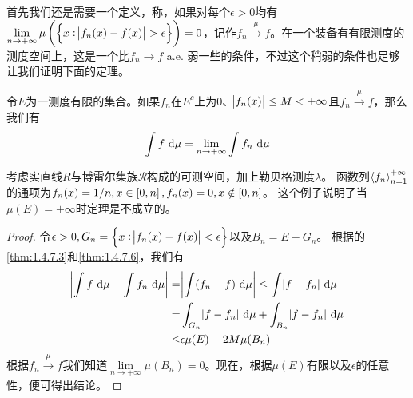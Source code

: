 \documentclass[../main.tex]{subfiles}
\begin{document}
首先我们还是需要一个定义，称，如果对每个\(\epsilon>0\)均有\(\lim\limits_{n\rightarrow+\infty}\mu\del{\cbr{x:\envert{f_n(x)-f(x)}>\epsilon}}=0\)，记作\(f_n\xrightarrow{\mu}f\)。在一个装备有有限测度的测度空间上，这是一个比\(f_n\rightarrow f\) a.e. 弱一些的条件，不过这个稍弱的条件也足够让我们证明下面的定理。
\begin{theorem}
	\label{thm:1.5.3}
	令\(E\)为一测度有限的集合。如果\(f_n\)在\(E^c\)上为\(0\)、\(\envert{f_n(x)}\leq M<+\infty\)且\(f_n\xrightarrow{\mu}f\)，那么我们有
	\[\int f\,\dif\mu=\lim\limits_{n\rightarrow+\infty}\int f_n\,\dif\mu\]
\end{theorem}
\begin{example}\label{ex:1.5.4}
	考虑实直线\(R\)与博雷尔集族\(\mathcal{R}\)构成的可测空间，加上勒贝格测度\(\lambda\)。
	函数列\(\left<f_n\right>^{+\infty}_{n=1}\)的通项为\(f_n(x)=1/n, x\in\intcc{0,n},f_n(x)=0,x\notin\intcc{0,n}\)。
	这个例子说明了当\(\mu(E)=+\infty\)时定理是不成立的。
\end{example}
\begin{proof}
	令\(\epsilon>0, G_n=\cbr{x:\envert{f_n(x)-f(x)}<\epsilon}\)以及\(B_n=E-G_n\)。
	根据的\ref{thm:1.4.7.3}和\ref{thm:1.4.7.6}，我们有
	\[\begin{split}
		\envert{\int f\,\dif\mu-\int f_n\,\dif\mu}=&\envert{\int(f_n-f)\,\dif\mu}\leq\int\envert{f-f_n}\,\dif\mu\\
		=&\int_{G_n}\envert{f-f_n}\,\dif\mu+\int_{B_n}\envert{f-f_n}\,\dif\mu\\
		\leq&\epsilon\mu(E)+2M\mu(B_n)
	\end{split}\]
	根据\(f_n\xrightarrow{\mu}f\)我们知道\(\lim\limits_{n\rightarrow+\infty}\mu(B_n)=0\)。现在，根据\(\mu(E)\)有限以及\(\epsilon\)的任意性，便可得出结论。
\end{proof}
\end{document}
